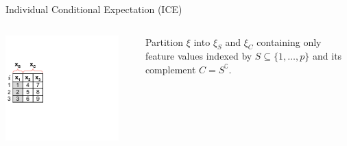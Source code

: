 \documentclass[11pt,compress,t,notes=noshow, aspectratio=169, xcolor=table]{beamer}
\begin{document}
\begin{frame}{Individual Conditional Expectation (ICE) }

\begin{columns}[T]
\begin{column}{0.16\textwidth} %
\includegraphics[page=1, trim=0cm 0.35cm 4.53cm 0.35cm, clip, width=0.9\textwidth]{figure_man/ice_plot_demo}
\end{column}
\begin{column}{0.84\textwidth}


Partition $\xi$ into $\xi_S$ and $\xi_C$ containing only feature values indexed by $S \subseteq \{1, \dots, p\}$ and its complement $C = S^\complement$.
\lz


\end{column}
\end{columns}
\end{frame}
\end{document}
